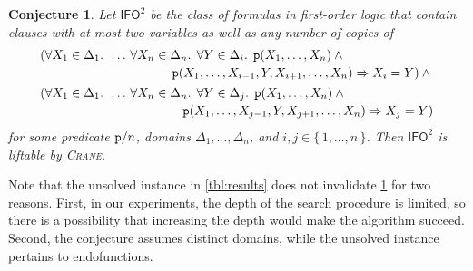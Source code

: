 \documentclass{article}
\newtheorem{conjecture}{Conjecture}
\newcommand{\Ctwo}{$\mathsf{C}^{2}$}
\newcommand{\IFO}{$\mathsf{I}\mathsf{FO}^{2}$}
\newcommand{\predicate}{\texttt{\textup{p}}}
\begin{document}
\begin{conjecture}\label{conj}
  Let \IFO{} be the class of formulas in first-order logic that contain clauses
  with at most two variables as well as any number of copies of
  \begin{align*}
    &\begin{multlined}[t][0.9\linewidth]
      (\forall X_{1} \in \Delta_{1}\text{. }\dots\,\forall X_{n} \in \Delta_{n}\text{. }\forall Y \in \Delta_{i}\text{. }\predicate(X_{1}, \dots, X_{n}) \land{}\\
      \predicate(X_{1}, \dots, X_{i-1}, Y, X_{i+1}, \dots, X_{n}) \Rightarrow X_{i} = Y) \land{}
    \end{multlined}\\
    &\begin{multlined}[t][0.9\linewidth]
      (\forall X_{1} \in \Delta_{1}\text{. }\dots\,\forall X_{n} \in \Delta_{n}\text{. }\forall Y \in \Delta_{j}\text{. }\predicate(X_{1}, \dots, X_{n}) \land{}\\
      \predicate(X_{1}, \dots, X_{j-1}, Y, X_{j+1}, \dots, X_{n}) \Rightarrow X_{j} = Y)
    \end{multlined}
  \end{align*}
  for some predicate $\predicate/n$, domains
  $\Delta_{1}, \dots, \Delta_{n}$, and $i, j \in \{\, 1, \dots, n \,\}$. Then
  \IFO{} is liftable by \textsc{Crane}.
\end{conjecture}

Note that the unsolved instance in \cref{tbl:results} does not invalidate
\cref{conj} for two reasons. First, in our experiments, the depth of the search
procedure is limited, so there is a possibility that increasing the depth would
make the algorithm succeed. Second, the conjecture assumes distinct domains,
while the unsolved instance pertains to endofunctions.




\end{document}
